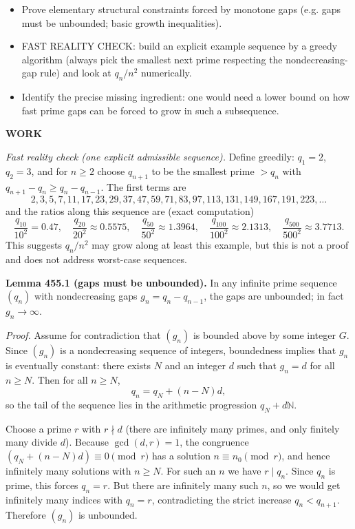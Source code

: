\begin{itemize}
\item Prove elementary structural constraints forced by monotone gaps (e.g. gaps must be unbounded; basic growth inequalities).
\item FAST REALITY CHECK: build an explicit example sequence by a greedy algorithm (always pick the smallest next prime respecting the nondecreasing-gap rule) and look at $q_n/n^2$ numerically.
\item Identify the precise missing ingredient: one would need a lower bound on how fast prime gaps can be forced to grow in such a subsequence.
\end{itemize}

\textbf{WORK}

\emph{Fast reality check (one explicit admissible sequence).}
Define greedily: $q_1=2$, $q_2=3$, and for $n\ge 2$ choose $q_{n+1}$ to be the smallest prime $>q_n$ with $q_{n+1}-q_n\ge q_n-q_{n-1}$.
The first terms are
\[
2,3,5,7,11,17,23,29,37,47,59,71,83,97,113,131,149,167,191,223,\dots
\]
and the ratios along this sequence are (exact computation)
\[
\frac{q_{10}}{10^2}=0.47,\quad \frac{q_{20}}{20^2}\approx 0.5575,\quad \frac{q_{50}}{50^2}\approx 1.3964,\quad \frac{q_{100}}{100^2}\approx 2.1313,\quad \frac{q_{500}}{500^2}\approx 3.7713.
\]
This suggests $q_n/n^2$ may grow along at least this example, but this is not a proof and does not address worst-case sequences.

\medskip

\textbf{Lemma 455.1 (gaps must be unbounded).}
In any infinite prime sequence $(q_n)$ with nondecreasing gaps $g_n=q_n-q_{n-1}$, the gaps are unbounded; in fact $g_n\to\infty$.

\emph{Proof.}
Assume for contradiction that $(g_n)$ is bounded above by some integer $G$. Since $(g_n)$ is a nondecreasing sequence of integers, boundedness implies that $g_n$ is eventually constant: there exists $N$ and an integer $d$ such that $g_n=d$ for all $n\ge N$.
Then for all $n\ge N$,
\[
q_{n}=q_N+(n-N)d,
\]
so the tail of the sequence lies in the arithmetic progression $q_N+d\mathbb N$.

Choose a prime $r$ with $r\nmid d$ (there are infinitely many primes, and only finitely many divide $d$).
Because $\gcd(d,r)=1$, the congruence $(q_N+(n-N)d)\equiv 0\pmod r$ has a solution $n\equiv n_0\pmod r$, and hence infinitely many solutions with $n\ge N$.
For such an $n$ we have $r\mid q_n$. Since $q_n$ is prime, this forces $q_n=r$.
But there are infinitely many such $n$, so we would get infinitely many indices with $q_n=r$, contradicting the strict increase $q_n<q_{n+1}$.
Therefore $(g_n)$ is unbounded.

